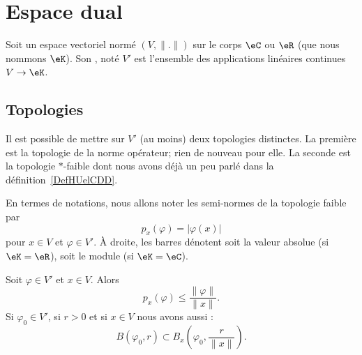 \section{Espace dual}
\label{SECooKOJNooQVawFY}

\begin{definition}
    Soit un espace vectoriel normé \( (V,\| . \|)\) sur le corps \( \eC\) ou \( \eR\) (que nous nommons \( \eK\)). Son , noté \( V'\) est l'ensemble des applications linéaires continues \( V\to \eK\).
\end{definition}

\subsection{Topologies}

Il est possible de mettre sur \( V'\) (au moins) deux topologies distinctes. La première est la topologie de la norme opérateur; rien de nouveau pour elle. La seconde est la topologie \( *\)-faible dont nous avons déjà un peu parlé dans la définition~\ref{DefHUelCDD}.

En termes de notations, nous allons noter les semi-normes de la topologie faible par
\begin{equation}
    p_x(\varphi)=| \varphi(x) |
\end{equation}
pour \( x\in V\) et \( \varphi\in V'\). À droite, les barres dénotent soit la valeur absolue (si \( \eK=\eR\)), soit le module (si \( \eK=\eC\)).

\begin{lemma}       \label{LEMooFMAUooQBIeTh}
    Soit \( \varphi\in V'\) et \( x\in V\). Alors
    \begin{equation}
        p_x(\varphi)\leq\frac{ \| \varphi \| }{ \| x \| }.
    \end{equation}
    Si \( \varphi_0\in V'\), si \( r>0\) et si \( x\in V\) nous avons aussi :
    \begin{equation}
        B(\varphi_0,r)\subset B_x(\varphi_0,\frac{ r }{ \| x \| }).
    \end{equation}
\end{lemma}

